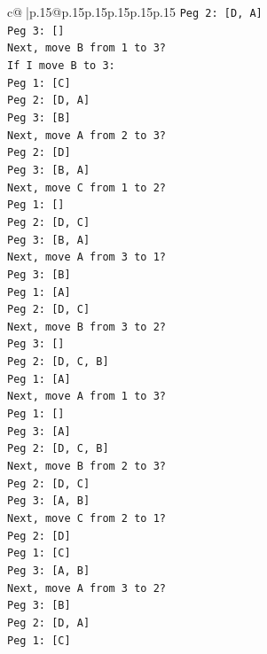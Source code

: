 \documentclass{article}
\begin{document}
{\begin{supertabular}{c@{$\;$}|p{.15\linewidth}@{}p{.15\linewidth}p{.15\linewidth}p{.15\linewidth}p{.15\linewidth}p{.15\linewidth}}
{{{\texttt{Peg 2: {[}D, A{]}} \\
\texttt{Peg 3: {[}{]}} \\
\texttt{Next, move B from 1 to 3?} \\
\texttt{If I move B to 3:} \\
\texttt{Peg 1: {[}C{]}} \\
\texttt{Peg 2: {[}D, A{]}} \\
\texttt{Peg 3: {[}B{]}} \\
\texttt{Next, move A from 2 to 3?} \\
\texttt{Peg 2: {[}D{]}} \\
\texttt{Peg 3: {[}B, A{]}} \\
\texttt{Next, move C from 1 to 2?} \\
\texttt{Peg 1: {[}{]}} \\
\texttt{Peg 2: {[}D, C{]}} \\
\texttt{Peg 3: {[}B, A{]}} \\
\texttt{Next, move A from 3 to 1?} \\
\texttt{Peg 3: {[}B{]}} \\
\texttt{Peg 1: {[}A{]}} \\
\texttt{Peg 2: {[}D, C{]}} \\
\texttt{Next, move B from 3 to 2?} \\
\texttt{Peg 3: {[}{]}} \\
\texttt{Peg 2: {[}D, C, B{]}} \\
\texttt{Peg 1: {[}A{]}} \\
\texttt{Next, move A from 1 to 3?} \\
\texttt{Peg 1: {[}{]}} \\
\texttt{Peg 3: {[}A{]}} \\
\texttt{Peg 2: {[}D, C, B{]}} \\
\texttt{Next, move B from 2 to 3?} \\
\texttt{Peg 2: {[}D, C{]}} \\
\texttt{Peg 3: {[}A, B{]}} \\
\texttt{Next, move C from 2 to 1?} \\
\texttt{Peg 2: {[}D{]}} \\
\texttt{Peg 1: {[}C{]}} \\
\texttt{Peg 3: {[}A, B{]}} \\
\texttt{Next, move A from 3 to 2?} \\
\texttt{Peg 3: {[}B{]}} \\
\texttt{Peg 2: {[}D, A{]}} \\
\texttt{Peg 1: {[}C{]}} \\
}}}
\end{supertabular}}
\end{document}
